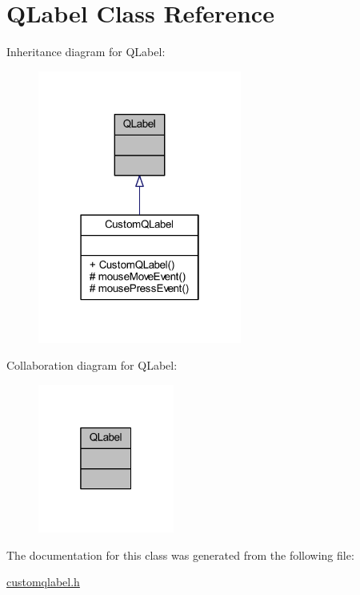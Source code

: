 \hypertarget{class_q_label}{}\section{Q\+Label Class Reference}
\label{class_q_label}


Inheritance diagram for Q\+Label\+:\nopagebreak
\begin{figure}[H]
\begin{center}
\leavevmode
\includegraphics[width=190pt]{class_q_label__inherit__graph}
\end{center}
\end{figure}


Collaboration diagram for Q\+Label\+:\nopagebreak
\begin{figure}[H]
\begin{center}
\leavevmode
\includegraphics[width=127pt]{class_q_label__coll__graph}
\end{center}
\end{figure}


The documentation for this class was generated from the following file\+:\begin{DoxyCompactItemize}
\item 
\mbox{\hyperlink{customqlabel_8h}{customqlabel.\+h}}\end{DoxyCompactItemize}
